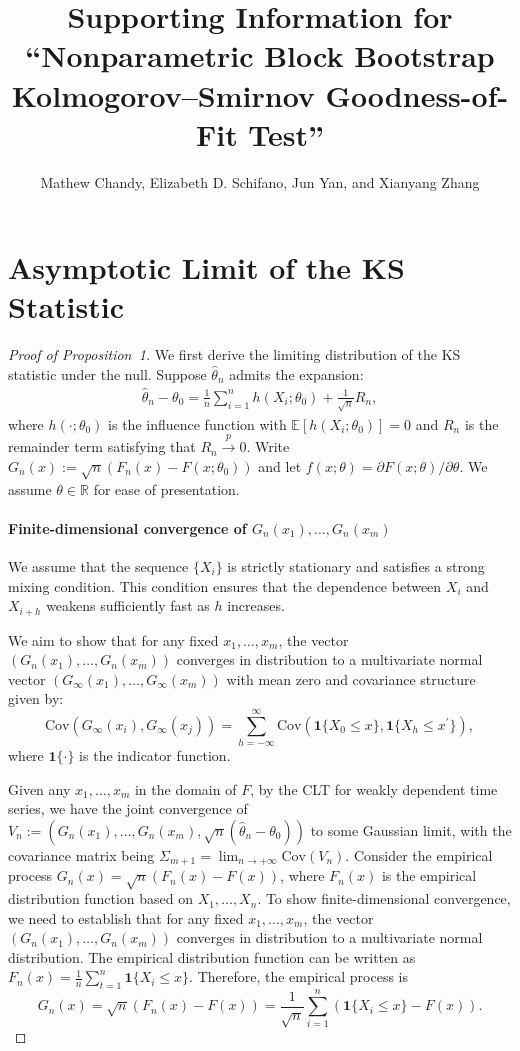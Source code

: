 \documentclass[12pt]{article}
\title{Supporting Information for
  ``Nonparametric Block Bootstrap Kolmogorov--Smirnov Goodness-of-Fit
  Test''}
\author{Mathew Chandy, Elizabeth D. Schifano, Jun Yan, and Xianyang
  Zhang}
\begin{document}
\maketitle


\section{Asymptotic Limit of the KS Statistic}

\begin{proof}[Proof of Proposition~1]
We first derive the limiting distribution of the KS statistic under the null. 
Suppose $\hat{\theta}_n$ admits the expansion:
\begin{align}\label{eq-expan}
\hat{\theta}_n-\theta_0 = \frac{1}{n}\sum^{n}_{i=1}h(X_i;\theta_0) + 
\frac{1}{\sqrt{n}}R_n,    
\end{align}
where $h(\cdot;\theta_0)$ is the influence function with 
$\mathbb{E}[h(X_i;\theta_0)]=0$ and $R_n$ is the remainder term satisfying that
$R_n\overset{p}{\rightarrow} 0.$ Write $G_n(x):=\sqrt{n}(F_n(x) - 
F(x; \theta_0))$ 
and let $f(x;\theta)=\partial F(x;\theta)/\partial \theta$. We assume 
$\theta \in \mathbb{R}$ for ease of presentation.

\paragraph{Finite-dimensional convergence of $G_n(x_1),\dots,G_n(x_m)$}

We assume that the sequence \(\{X_i\}\) is strictly stationary and satisfies a 
strong mixing condition. This condition ensures that the dependence between 
\(X_i\) and \(X_{i+h}\) weakens sufficiently fast as \(h\) increases.


We aim to show that for any fixed \( x_1, \ldots, x_m \), the vector
\( (G_n(x_1), \ldots, G_n(x_m)) \) converges in distribution to a
multivariate normal vector \( (G_{\infty}(x_1), \ldots,
G_{\infty}(x_m)) \) with mean zero and covariance structure given by:
\[
  \text{Cov}(G_{\infty}(x_i), G_{\infty}(x_j)) =
  \sum_{h=-\infty}^{\infty}
  \text{Cov}(\mathbf{1}\{X_0 \leq x\}, \mathbf{1}\{X_h \leq x^{\prime}\}),
\]
where $ \mathbf{1}\{\cdot\}$ is the indicator
function.


Given any $x_1,\dots,x_m$ in the domain of $F$, by the CLT for weakly dependent 
time series, we have the joint convergence of 
$V_n:=(G_n(x_1),\dots,G_n(x_m),\sqrt{n}(\hat{\theta}_n-\theta_0))$
to some Gaussian limit, with the covariance matrix being 
$\Sigma_{m+1}=\lim_{n\rightarrow+\infty}\text{Cov}(V_n)$.
Consider the empirical process $ G_n(x) = \sqrt{n} (F_n(x) - F(x)) $, where 
$ F_n(x) $ is the empirical distribution function based on $ X_1, \ldots, 
X_n $. To show finite-dimensional convergence, we need to establish that for 
any fixed $ x_1, \ldots, x_m $, the vector $ (G_n(x_1), \ldots, G_n(x_m)) $ 
converges in distribution to a multivariate normal distribution.
The empirical distribution function can be written as
$
F_n(x) = \frac{1}{n} \sum_{t=1}^n \mathbf{1}\{X_i \leq x\}.
$
Therefore, the empirical process is
\[
G_n(x) = \sqrt{n} (F_n(x) - F(x)) = \frac{1}{\sqrt{n}} \sum_{i=1}^n 
(\mathbf{1}\{X_i \leq x\} - F(x)).
\]



\end{proof}
\end{document}
